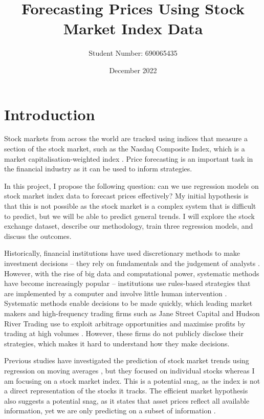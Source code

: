 \documentclass[a4paper, 11pt]{article}
\begin{document}
\title{Forecasting Prices Using Stock Market Index Data}
\author{Student Number: 690065435}
\date{December 2022}
\maketitle

\section{Introduction}
Stock markets from across the world are tracked using indices that measure a section of the stock market, such as the Nasdaq Composite Index, which is a market capitalisation-weighted index \cite{nasdaqCompositeWeighting}. Price forecasting is an important task in the financial industry as it can be used to inform strategies.

In this project, I propose the following question: can we use regression models on stock market index data to forecast prices effectively? My initial hypothesis is that this is not possible as the stock market is a complex system that is difficult to predict, but we will be able to predict general trends. I will explore the stock exchange dataset, describe our methodology, train three regression models, and discuss the outcomes.

Historically, financial institutions have used discretionary methods to make investment decisions -- they rely on fundamentals and the judgement of analysts \cite{harvey2017man}. However, with the rise of big data and computational power, systematic methods have become increasingly popular -- institutions use rules-based strategies that are implemented by a computer and involve little human intervention \cite{harvey2017man}. Systematic methods enable decisions to be made quickly, which leading market makers and high-frequency trading firms such as Jane Street Capital and Hudson River Trading use to exploit arbitrage opportunities and maximise profits by trading at high volumes \cite{aldridge2013high}. However, these firms do not publicly disclose their strategies, which makes it hard to understand how they make decisions.

Previous studies have investigated the prediction of stock market trends using regression on moving averages \cite{dinesh2021prediction}, but they focused on individual stocks whereas I am focusing on a stock market index. This is a potential snag, as the index is not a direct representation of the stocks it tracks. The efficient market hypothesis also suggests a potential snag, as it states that asset prices reflect all available information, yet we are only predicting on a subset of information \cite{fama1970efficient}. 
\end{document}
